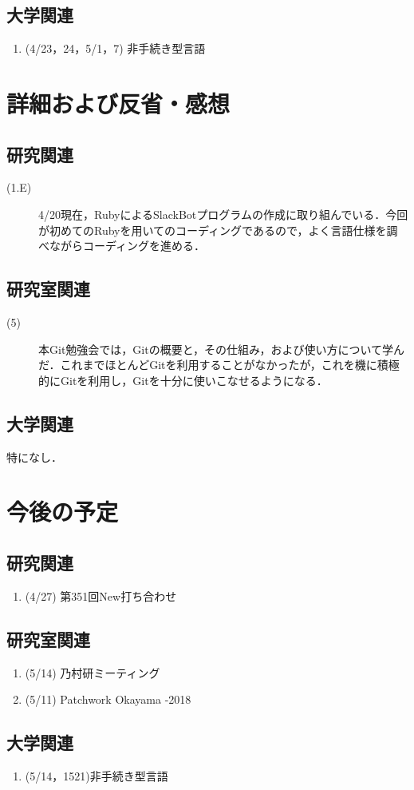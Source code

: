 \documentclass[12pt]{jsarticle}
\begin{document}
\subsection{大学関連}\label{daigaku}
\begin{enumerate}
\item (4/23，24，5/1，7) 非手続き型言語
\end{enumerate}

\section{詳細および反省・感想}
\subsection{研究関連}
\begin{description}
\item[(1.E)] 4/20現在，RubyによるSlackBotプログラムの作成に取り組んでいる．今回が初めてのRubyを用いてのコーディングであるので，よく言語仕様を調べながらコーディングを進める．
\end{description}
\subsection{研究室関連}
\begin{description}
\item[(5)] 本Git勉強会では，Gitの概要と，その仕組み，および使い方について学んだ．これまでほとんどGitを利用することがなかったが，これを機に積極的にGitを利用し，Gitを十分に使いこなせるようになる．
\end{description}
\subsection{大学関連}
特になし．

\section{今後の予定}
\subsection{研究関連}
\begin{enumerate}
\item (4/27) 第351回New打ち合わせ
\end{enumerate}
\subsection{研究室関連}
\begin{enumerate}
\item (5/14) 乃村研ミーティング
\item (5/11) Patchwork Okayama -2018
\end{enumerate}
\subsection{大学関連}
\begin{enumerate}
\item (5/14，1521)非手続き型言語 
\end{enumerate}


%
\end{document}
